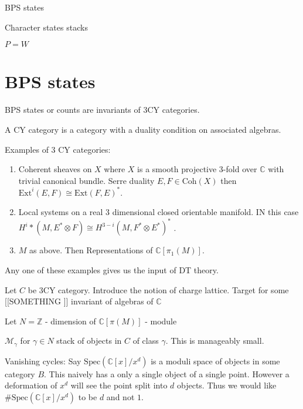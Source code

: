 % 


\title{}
\author{Ben}
\date{}

 
\maketitle

BPS states 

Character states stacks 

$P = W$ 

\section{BPS states} %

\begin{definition}
    BPS states or counts are invariants of 3CY categories. 
\end{definition}

A CY category is a category with a duality condition on associated algebras.

Examples of 3 CY categories:
\begin{enumerate}
    \item Coherent sheaves on $X$ where $X$ is a smooth projective 3-fold over $ \mathbb{C} $ 
        with trivial canonical bundle. 
        Serre duality $E, F \in \mathrm{Coh} (X) $ then $ \mathrm{Ext} ^i (E, F)  \cong \mathrm{Ext}  ( F, E) ^* $.
    \item Local systems on a real 3 dimensional closed orientable manifold. 
        IN this case $ H^i * (M, E^* \otimes F ) \cong H ^{3-i } ( M, F^* \otimes E^* ) ^* $ .
    \item $M$ as above. Then Representations of $ \mathbb{C} [ \pi_1 ( M) ] $. 
\end{enumerate}
Any one of these examples gives us the input of DT theory. 

Let $ C $ be 3CY category. 
Introduce the notion of charge lattice. 
Target for some [[SOMETHING ]]  invariant of algebras of $ \mathbb{C} $ 

Let $ N = \mathbb{Z}  $ - dimension of $ \mathbb{C} [ \pi ( M) ] $ - module 

$ \mathcal{M} _\gamma $ for $ \gamma \in N $ stack of objects  in $ C $ of class $ \gamma $. 
This is manageably small. 

Vanishing cycles: Say $\mathrm{Spec} ( \mathbb{C} [x]/ x^d ) $ is a moduli space of objects in some category $B$. 
This naively has a only a single object of a single point. 
However a deformation of $x^d $ will see the point split into $d$ objects. 
Thus we would like $ \# \mathrm{Spec} ( \mathbb{C} [x]/ x^d ) $ to be $ d$ and not $1$. 

